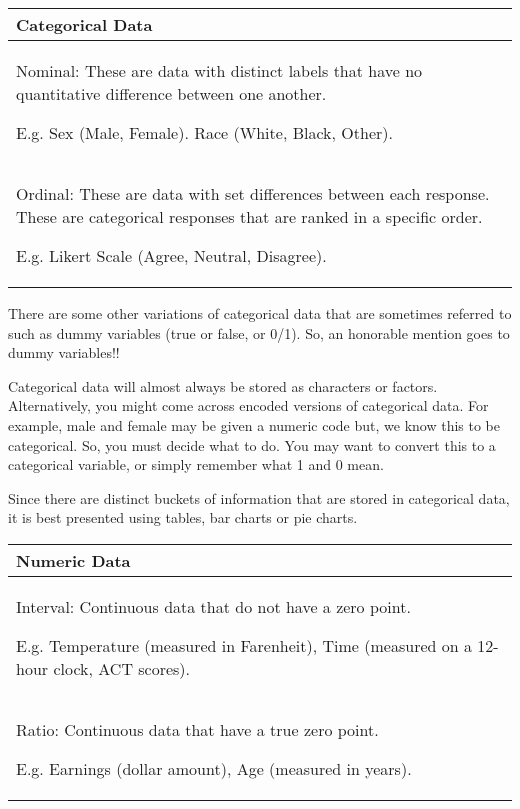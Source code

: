 \documentclass[
  letterpaper,
  DIV=11,
  numbers=noendperiod]{scrreprt}
\begin{document}
\begin{longtable}[]{@{}
  >{\raggedright\arraybackslash}p{}@{}}
\toprule\noalign{}
\begin{minipage}[b]{\linewidth}\raggedright
Categorical Data
\end{minipage} \\
\midrule\noalign{}
\endhead
\bottomrule\noalign{}
\endlastfoot
Nominal: These are data with distinct labels that have no quantitative
difference between one another.

E.g. Sex (Male, Female). Race (White, Black, Other). \\
Ordinal: These are data with set differences between each response.
These are categorical responses that are ranked in a specific order.

E.g. Likert Scale (Agree, Neutral, Disagree). \\
\end{longtable}

There are some other variations of categorical data that are sometimes
referred to such as dummy variables (true or false, or 0/1). So, an
honorable mention goes to dummy variables!!

Categorical data will almost always be stored as characters or factors.
Alternatively, you might come across encoded versions of categorical
data. For example, male and female may be given a numeric code but, we
know this to be categorical. So, you must decide what to do. You may
want to convert this to a categorical variable, or simply remember what
1 and 0 mean.

Since there are distinct buckets of information that are stored in
categorical data, it is best presented using tables, bar charts or pie
charts.

\begin{longtable}[]{@{}
  >{\raggedright\arraybackslash}p{}@{}}
\toprule\noalign{}
\begin{minipage}[b]{\linewidth}\raggedright
Numeric Data
\end{minipage} \\
\midrule\noalign{}
\endhead
\bottomrule\noalign{}
\endlastfoot
Interval: Continuous data that do not have a zero point.

E.g. Temperature (measured in Farenheit), Time (measured on a 12-hour
clock, ACT scores). \\
Ratio: Continuous data that have a true zero point.

E.g. Earnings (dollar amount), Age (measured in years). \\
\end{longtable}
\end{document}
